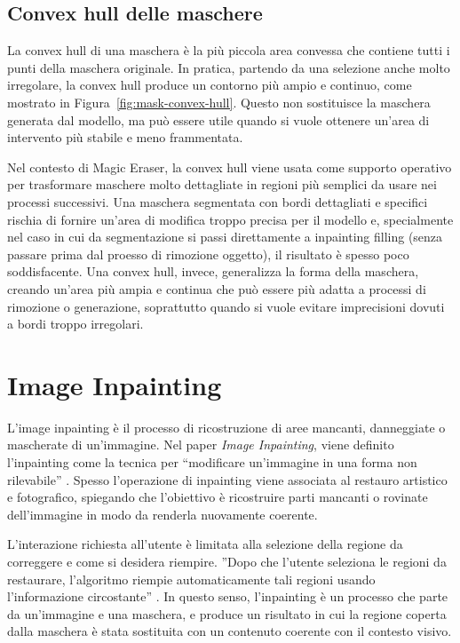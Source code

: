 \documentclass[oneside]{supsistudent}
\begin{document}
\subsection{Convex hull delle maschere}

La convex hull di una maschera è la più piccola area convessa che contiene tutti
i punti della maschera originale. In pratica, partendo da una selezione anche
molto irregolare, la convex hull produce un contorno più ampio e continuo, come
mostrato in Figura~\ref{fig:mask-convex-hull}. Questo non sostituisce la
maschera generata dal modello, ma può essere utile quando si vuole ottenere
un'area di intervento più stabile e meno frammentata.

Nel contesto di Magic Eraser, la convex hull viene usata come supporto operativo
per trasformare maschere molto dettagliate in regioni più semplici da usare nei
processi successivi.
Una maschera segmentata con bordi dettagliati e specifici rischia di fornire
un'area di modifica troppo precisa per il modello e, specialmente nel caso
in cui da segmentazione si passi direttamente a inpainting filling (senza passare
prima dal proesso di rimozione oggetto), il risultato è spesso
poco soddisfacente. Una
convex hull, invece, generalizza la forma della maschera, creando un'area più
ampia e continua che può essere più adatta a processi di rimozione o generazione,
soprattutto quando si vuole evitare imprecisioni dovuti a bordi troppo irregolari.


\FloatBarrier

\section{Image Inpainting}

L'image inpainting è il processo di ricostruzione di aree mancanti,
danneggiate o mascherate di un'immagine. Nel paper
\textit{Image Inpainting}, viene definito l'inpainting come la
tecnica per ``modificare un'immagine in una forma non
rilevabile'' \cite{bertalmio-inpainting}. Spesso l'operazione di inpainting
viene associata al restauro artistico e fotografico, spiegando che l'obiettivo
è ricostruire parti mancanti o rovinate dell'immagine in modo
da renderla nuovamente coerente.

L'interazione richiesta all'utente è limitata alla selezione
della regione da correggere e come si desidera riempire. ''Dopo che
l'utente seleziona le regioni da restaurare,
l'algoritmo riempie automaticamente tali regioni usando
l'informazione circostante'' \cite{bertalmio-inpainting}.
In questo senso, l'inpainting è un processo che parte da un'immagine
e una maschera, e produce un risultato in cui la regione coperta
dalla maschera è stata sostituita con un contenuto coerente con
il contesto visivo.
\end{document}
